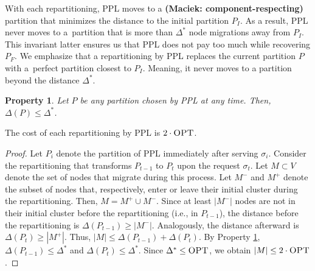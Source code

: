 \documentclass[a4paper,anonymous,USenglish]{lipics-v2019}
\newcommand{\OPT}{\textsc{OPT}\xspace}
\newcommand{\PPL}{\textsc{PPL}\xspace}
\newtheorem{property}{Property}
\newcommand\maciek[1]{\color{brown}\textbf{(Maciek: #1)}\color{black}}
\begin{document}
With each repartitioning,
\PPL moves to a \maciek{component-respecting} partition that minimizes the distance to the initial partition $P_I$.
As a result,
\PPL never moves to a~partition that is more than $\Delta^*$  node migrations away from $P_I$.
This invariant latter ensures us that \PPL does not pay too much while recovering $P_F$.
We emphasize that a repartitioning by \PPL replaces the current partition $P$ with a~perfect partition closest to $P_I$.
Meaning, it never moves to a partition beyond the distance $\Delta^*$.

\begin{property} \label{prop:dist<OPT}
	Let $P$ be any partition chosen by \PPL at any time.
	Then, $\Delta(P) \leq \Delta^*$.	
\end{property}

\begin{lemma}	\label{lemma:rebalancecost}
	The cost of each repartitioning by \PPL is $2\cdot\OPT$.
\end{lemma}
\begin{proof}
	Let $P_i$ denote the partition of \PPL immediately after serving $\sigma_{i}$.
	Consider the repartitioning that transforms 
	$P_{t-1}$ to $P_t$ upon the request $\sigma_t$.
	Let $M \subset V$ denote the set of nodes that migrate during this process.
	Let $M^-$ and $M^+$ denote the subset of nodes that, respectively,
	enter or leave their initial cluster during the repartitioning.    
	Then,
	$M = M^+ \cup M^-$.
	Since at least $|M^-|$ nodes are not in their initial cluster before the repartitioning (i.e., in $P_{t-1}$),
	the distance before the repartitioning is $\Delta(P_{t-1}) \geq | M^-|$.
	Analogously,
	the distance afterward is $\Delta(P_{t}) \geq | M^+|$.
	Thus,
	$|M| \leq \Delta(P_{t-1}) + \Delta(P_{t})$.
	By Property \ref{prop:dist<OPT},
	$\Delta(P_{t-1})  \leq \Delta^*$ and
	$\Delta(P_{t}) \leq \Delta^*$.
	Since $\Delta^* \leq \OPT$,
	we obtain	 $|M| \leq 2\cdot\OPT$.
\end{proof}
\end{document}
